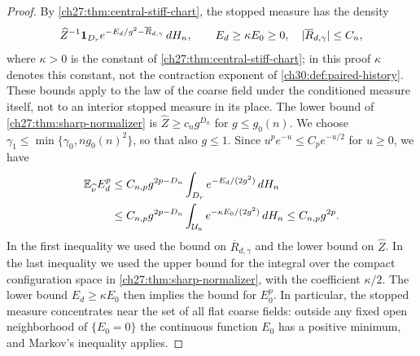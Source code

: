 \begin{proof}
By \cref{ch27:thm:central-stiff-chart}, the stopped measure has the density
\[
 \widehat Z^{-1}\mathbf 1_{D_r}e^{-E_d/g^2-\overline R_{d,\gamma}}\,dH_n,\qquad E_d\ge \kappa E_0\ge0,\quad\lvert \overline R_{d,\gamma}\rvert\le C_n,
\]
where $\kappa>0$ is the constant of \cref{ch27:thm:central-stiff-chart}; in this proof $\kappa$ denotes this constant, not the contraction exponent of \cref{ch30:def:paired-history}. These bounds apply to the law of the coarse field under the conditioned measure itself, not to an interior stopped measure in its place. The lower bound of \cref{ch27:thm:sharp-normalizer} is $\widehat Z\ge c_ng^{D_n}$ for $g\le g_0(n)$. We choose $\gamma_1\le\min\{\gamma_0,ng_0(n)^2\}$, so that also $g\le1$. Since $u^pe^{-u}\le C_pe^{-u/2}$ for $u\ge0$, we have
\begin{align*}
 \mathbb E_{\widehat\nu}E_d^p&\le C_{n,p}g^{2p-D_n}\int_{D_r}e^{-E_d/(2g^2)}\,dH_n\\
 &\le C_{n,p}g^{2p-D_n}\int_{\mathcal U_{n}}e^{-\kappa E_0/(2g^2)}\,dH_n\le C_{n,p}g^{2p}.
\end{align*}
In the first inequality we used the bound on $\overline R_{d,\gamma}$ and the lower bound on $\widehat Z$. In the last inequality we used the upper bound for the integral over the compact configuration space in \cref{ch27:thm:sharp-normalizer}, with the coefficient $\kappa/2$. The lower bound $E_d\ge \kappa E_0$ then implies the bound for $E_0^p$. In particular, the stopped measure concentrates near the set of all flat coarse fields: outside any fixed open neighborhood of $\{E_0=0\}$ the continuous function $E_0$ has a positive minimum, and Markov's inequality applies.


\end{proof}
